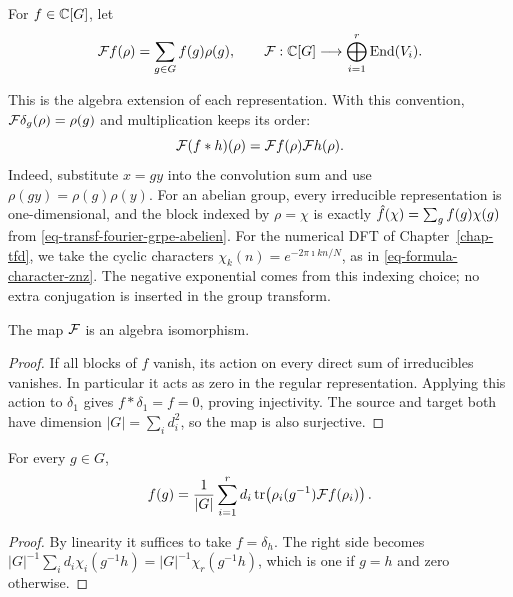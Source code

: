\begin{defn}
\label{defn-transform-fourier-group-non-commutative}
\label{notation-91}\label{notation-92}
For $f\in\mathbb{C}[G]$, let
\begin{equation}
\label{eq-defn-trans-fourier-representation}
 \mathcal{F} f(\rho)=\sum_{g\in G}f(g)\rho(g),\qquad
 \mathcal{F}:\mathbb{C}[G]\longrightarrow\bigoplus_{i=1}^r\operatorname{End}(V_i).
\end{equation}
\end{defn}
This is the algebra extension of each representation. With this convention,
$\mathcal{F}\delta_g(\rho)=\rho(g)$ and multiplication keeps its order:
\[
 \mathcal{F}(f*h)(\rho)=\mathcal{F} f(\rho)\mathcal{F} h(\rho).
\]
\label{notation-93}
Indeed, substitute $x=gy$ into the convolution sum and use
$\rho(gy)=\rho(g)\rho(y)$. For an abelian group, every irreducible
representation is one-dimensional, and the block indexed by $\rho=\chi$
is exactly $\hat{f}(\chi)=\sum_g f(g)\chi(g)$ from
\eqref{eq-transf-fourier-grpe-abelien}. For the numerical DFT of
Chapter~\ref{chap-tfd}, we take the cyclic characters
$\chi_k(n)=e^{-2\pi\imath kn/N}$, as in
\eqref{eq-formula-character-znz}. The negative exponential comes from
this indexing choice; no extra conjugation is inserted in the group
transform.


\begin{prop}
\label{prop-bijectivity-transf-fourier}
The map $\mathcal{F}$ is an algebra isomorphism.
\end{prop}
\begin{proof}
If all blocks of $f$ vanish, its action on every direct sum of irreducibles
vanishes. In particular it acts as zero in the regular representation.
Applying this action to $\delta_1$ gives $f*\delta_1=f=0$, proving
injectivity. The source and target both have dimension
$|G|=\sum_i d_i^2$, so the map is also surjective.
\end{proof}


\begin{thm}
\label{thm-formula-inversion-representation}
For every $g\in G$,
\[
 f(g)=\frac1{|G|}\sum_{i=1}^r d_i
       \operatorname{tr}\!\left(\rho_i(g^{-1})\mathcal{F} f(\rho_i)\right).
\]
\end{thm}
\begin{proof}
By linearity it suffices to take $f=\delta_h$. The right side becomes
$|G|^{-1}\sum_i d_i\chi_i(g^{-1}h)=|G|^{-1}\chi_r(g^{-1}h)$,
which is one if $g=h$ and zero otherwise.
\end{proof}

